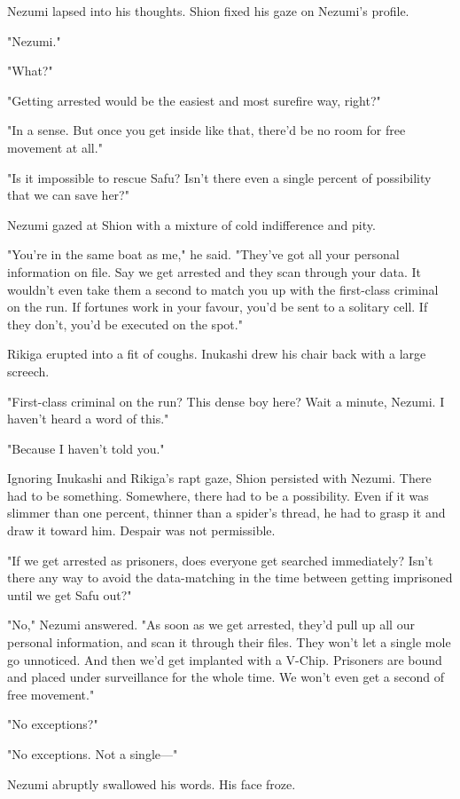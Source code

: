 Nezumi lapsed into his thoughts. Shion fixed his gaze on Nezumi's
profile.

"Nezumi."

"What?"

"Getting arrested would be the easiest and most surefire way, right?"

"In a sense. But once you get inside like that, there'd be no room for
free movement at all."

"Is it impossible to rescue Safu? Isn't there even a single percent of
possibility that we can save her?"

Nezumi gazed at Shion with a mixture of cold indifference and pity.

"You're in the same boat as me," he said. "They've got all your personal
information on file. Say we get arrested and they scan through your
data. It wouldn't even take them a second to match you up with the
first-class criminal on the run. If fortunes work in your favour, you'd
be sent to a solitary cell. If they don't, you'd be executed on the
spot."

Rikiga erupted into a fit of coughs. Inukashi drew his chair back with a
large screech.

"First-class criminal on the run? This dense boy here? Wait a minute,
Nezumi. I haven't heard a word of this."

"Because I haven't told you."

Ignoring Inukashi and Rikiga's rapt gaze, Shion persisted with Nezumi.
There had to be something. Somewhere, there had to be a possibility.
Even if it was slimmer than one percent, thinner than a spider's thread,
he had to grasp it and draw it toward him. Despair was not permissible.

"If we get arrested as prisoners, does everyone get searched
immediately? Isn't there any way to avoid the data-matching in the time
between getting imprisoned until we get Safu out?"

"No," Nezumi answered. "As soon as we get arrested, they'd pull up all
our personal information, and scan it through their files. They won't
let a single mole go unnoticed. And then we'd get implanted with a
V-Chip. Prisoners are bound and placed under surveillance for the whole
time. We won't even get a second of free movement."

"No exceptions?"

"No exceptions. Not a single---"

Nezumi abruptly swallowed his words. His face froze.


